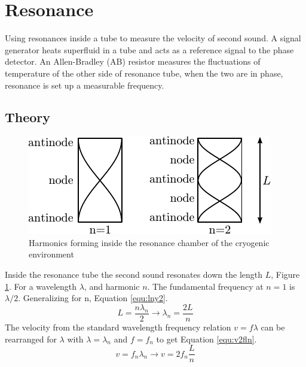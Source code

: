 \section{Resonance \label{sec:res}}
Using resonances inside a tube to measure the velocity of second sound.
A signal generator heats superfluid in a tube and acts as a reference signal
to the phase detector. An Allen-Bradley (AB) resistor measures the fluctuations
of temperature of the other side of resonance tube, when the two are
in phase, resonance is set up a measurable frequency.

\subsection{Theory}
\begin{figure}[htbp]
\centering
\includegraphics{pics/harmonicsintube.pdf}
\caption{Harmonics forming inside the resonance chamber of the cryogenic environment \label{fig:harmonicsintube}}
\end{figure}
Inside the resonance tube the second sound resonates down the length $L$, Figure \ref{fig:harmonicsintube}.
For a wavelength $\lambda$, and harmonic $n$.
The fundamental frequency at $n=1$ is $\lambda / 2$. Generalizing for n, Equation \ref{equ:lny2}.
\begin{equation}
L = \frac{n \lambda_n}{2} \to \lambda_n = \frac{2L}{n} \label{equ:lny2}
\end{equation}
The velocity from the standard wavelength frequency relation $v=f\lambda$ can be
rearranged for $\lambda$ with $\lambda = \lambda_n$ and $f = f_n$ to get Equation \ref{equ:v2fln}.
\begin{equation}
v = f_n\lambda_n \to v = 2f_n \frac{L}{n} \label{equ:v2fln}
\end{equation}

